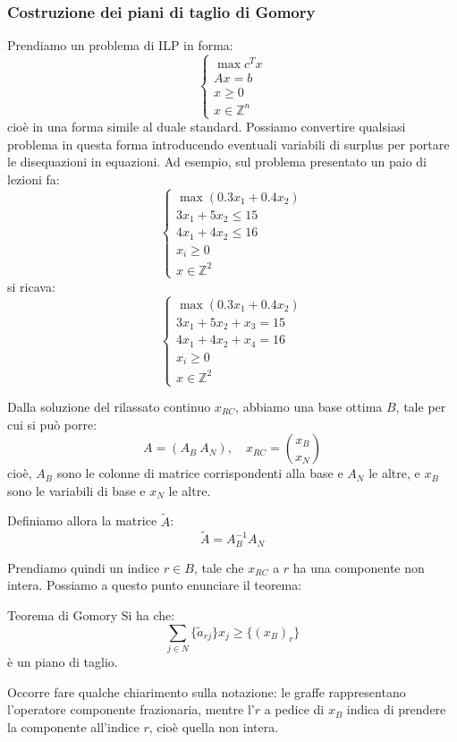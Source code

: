 \documentclass[a4paper,11pt]{article}
\begin{document}
\subsubsection{Costruzione dei piani di taglio di Gomory}
Prendiamo un problema di ILP in forma:
\[
	\begin{cases}
		\max c^T x \\ 
		Ax = b \\ 
		x \geq 0 \\ 
		x \in \mathbb{Z}^n
	\end{cases}
\]
cioè in una forma simile al duale standard.
Possiamo convertire qualsiasi problema in questa forma introducendo eventuali variabili di surplus per portare le disequazioni in equazioni.
Ad esempio, sul problema presentato un paio di lezioni fa:
\[
	\begin{cases}
		\max (0.3x_1 + 0.4x_2) \\ 
		3 x_1 + 5 x_2 \leq 15 \\ 
		4 x_1 + 4 x_2 \leq 16 \\ 
		x_i \geq 0 \\ 
		x \in \mathbb{Z}^2
	\end{cases}
\]
si ricava:
\[
	\begin{cases}
		\max (0.3x_1 + 0.4x_2) \\ 
		3 x_1 + 5 x_2 + x_3 = 15 \\ 
		4 x_1 + 4 x_2 + x_4 = 16 \\ 
		x_i \geq 0 \\ 
		x \in \mathbb{Z}^2
	\end{cases}
\]

Dalla soluzione del rilassato continuo $x_{RC}$, abbiamo una base ottima $B$, tale per cui si può porre:
$$
A = (A_B \  A_N), \quad x_{RC} = \binom{x_B}{x_N}
$$
cioè, $A_B$ sono le colonne di matrice corrispondenti alla base e $A_N$ le altre, e $x_B$ sono le variabili di base e $x_N$ le altre. 

Definiamo allora la matrice $\tilde{A}$:
$$ \tilde{A} = A_B^{-1} A_N $$

Prendiamo quindi un indice $r \in B$, tale che $x_{RC}$ a $r$ ha una componente non intera.
Possiamo a questo punto enunciare il teorema:

\begin{theorem}{Teorema di Gomory}
	Si ha che:
	$$
		\sum_{j \in N} \{ \tilde{a}_{rj} \} x_j \geq \{ ( x_{B} )_r \}
	$$
	è un piano di taglio.
\end{theorem}

Occorre fare qualche chiarimento sulla notazione: le graffe rappresentano l'operatore componente frazionaria, mentre l'$r$ a pedice di $x_{B}$ indica di prendere la componente all'indice $r$, cioè quella non intera.
\end{document}

